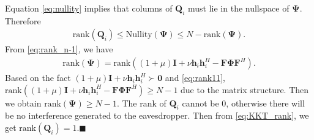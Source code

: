 \documentclass[journal]{IEEEtran}
\begin{document}
Equation \eqref{eq:nullity} implies that columns of $\mathbf{Q}_i$ must lie in the nullspace of $\mathbf{\Psi}$. Therefore
\begin{eqnarray} 
\text{rank}\left(\mathbf{Q}_i\right) \leq \text{Nullity}\left(\mathbf{\Psi}\right) \leq N - \text{rank}\left(\mathbf{\Psi}\right) \label{eq:KKT_rank}.
\end{eqnarray}
From \eqref{eq:rank_n-1}, we have
\begin{eqnarray}
\text{rank}\left(\mathbf{\Psi}\right) = \text{rank}\left((1 + \mu)\mathbf{I} + \nu\mathbf{h}_i\mathbf{h}_i^H - \mathbf{F}\mathbf{\Phi}\mathbf{F}^H\right). 
\end{eqnarray}
Based on the fact $(1 + \mu)\mathbf{I} + \nu\mathbf{h}_i\mathbf{h}_i^H \succ \mathbf{0}$ and \eqref{eq:rank11},  
$\text{rank}\left((1 + \mu)\mathbf{I} + \nu\mathbf{h}_i\mathbf{h}_i^H- \mathbf{F}\mathbf{\Phi}\mathbf{F}^H\right) \geq N - 1$ due to the matrix structure. Then we obtain $\text{rank}\left(\mathbf{\Psi}\right) \geq N - 1$. The rank of $\mathbf{Q}_i$ cannot be 0, otherwise there will be no interference generated to the eavesdropper. Then from \eqref{eq:KKT_rank}, we get $\text{rank}\left(\mathbf{Q}_i\right) = 1$.\hfill$\blacksquare$
\end{document}
